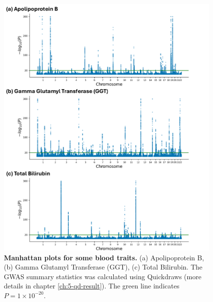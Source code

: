 \begin{figure}
     \centering
     \includegraphics[width=\textwidth]{figures/gb_deepadmix/gb_real_deep_6.pdf}
     \caption{\textbf{Manhattan plots for some blood traits.}
     (a) Apolipoprotein B, (b) Gamma Glutamyl Transferase (GGT), (c) Total Bilirubin. The GWAS summary statistics was calculated using Quickdraws (more details in chapter \ref{ch:5-qd-result}). The green line indicates $P = 1 \times 10^{-20}$.
    }
    \label{fig:gb_anchor_man}
\end{figure}

